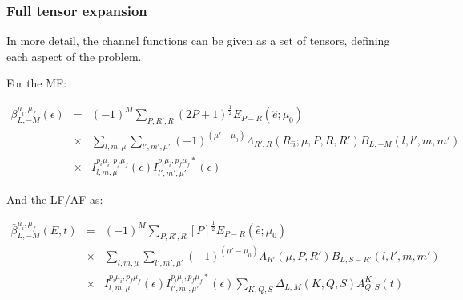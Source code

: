 \documentclass[10pt]{article}
\begin{document}





\subsubsection{Full tensor expansion\label{sec:full-tensor-expansion}}

In more detail, the channel functions can be given as a set of tensors, defining each aspect of the problem.

For the MF:

\begin{eqnarray}
\beta_{L,-M}^{\mu_{i},\mu_{f}}(\epsilon) & = & (-1)^{M}\sum_{P,R',R}(2P+1)^{\frac{1}{2}}{E_{P-R}(\hat{e};\mu_{0})}\\
 & \times &\sum_{l,m,\mu}\sum_{l',m',\mu'}(-1)^{(\mu'-\mu_{0})}{\Lambda_{R',R}(R_{\hat{n}};\mu,P,R,R')B_{L,-M}(l,l',m,m')}\\
 & \times & I_{l,m,\mu}^{p_{i}\mu_{i},p_{f}\mu_{f}}(\epsilon)I_{l',m',\mu'}^{p_{i}\mu_{i},p_{f}\mu_{f}*}(\epsilon)\label{eq:BLM-tensor-MF}
\end{eqnarray}

And the LF/AF as:

\begin{eqnarray}
\bar{\beta}_{L,-M}^{\mu_{i},\mu_{f}}(E,t) & = & (-1)^{M}\sum_{P,R',R}{[P]^{\frac{1}{2}}}{E_{P-R}(\hat{e};\mu_{0})}\\
 & \times &\sum_{l,m,\mu}\sum_{l',m',\mu'}(-1)^{(\mu'-\mu_{0})}{\Lambda_{R'}(\mu,P,R')B_{L,S-R'}(l,l',m,m')}\\
 & \times &I_{l,m,\mu}^{p_{i}\mu_{i},p_{f}\mu_{f}}(\epsilon)I_{l',m',\mu'}^{p_{i}\mu_{i},p_{f}\mu_{f}*}(\epsilon)\sum_{K,Q,S}\Delta_{L,M}(K,Q,S)A_{Q,S}^{K}(t)\label{eq:BLM-tensor-AF}
\end{eqnarray}
\end{document}

